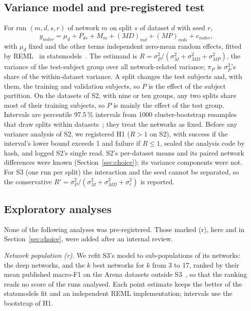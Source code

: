 \documentclass{IEEE_lsens}
\begin{document}
\subsection{Variance model and pre-registered test}
For run $(m,d,s,r)$ of network $m$ on split $s$ of dataset $d$ with seed $r$,
\begin{equation}
y_{mdsr} = \mu_d + P_{ds} + M_m + (MD)_{md} + (MP)_{mds} + e_{mdsr},\label{eq:model}
\end{equation}
with $\mu_d$ fixed and the other terms independent zero-mean random effects, fitted by REML~\cite{patterson1971recovery}
in statsmodels~\cite{seabold2010statsmodels}. The estimand is $R=\sigma^2_P/(\sigma^2_M+\sigma^2_{MD}+\sigma^2_{MP})$,
the variance of the test-subject group over all network-related variance; $\pi_P$ is $\sigma^2_P$'s share of the
within-dataset variance. A split changes the test subjects and, with them, the training and validation subjects, so
$P$ is the effect of the subject partition. On the datasets of S2, with nine or ten groups, any two splits share most
of their training subjects, so $P$ is mainly the effect of the test group. Intervals are percentile 97.5\,\% intervals from 1000 cluster-bootstrap
resamples that draw splits within datasets~\cite{field2007bootstrapping}; they treat the networks as fixed. Before any
variance analysis of S2, we registered H1 ($R>1$ on S2), with success if the interval's lower bound exceeds 1 and
failure if $R\le 1$, sealed the analysis code by hash, and logged S2's single read. S2's per-dataset means and its
paired network differences were known (Section~\ref{sec:choice}); its variance components were not. For S3 (one run per
split) the interaction and the seed cannot be separated, so the conservative
$R'=\sigma^2_P/(\sigma^2_M+\sigma^2_{MD}+\sigma^2_e)$ is reported.

\subsection{Exploratory analyses}
None of the following analyses was pre-registered. Those marked (r), here and in Section~\ref{sec:choice}, were
added after an internal review.

\emph{Network population (r).} We refit S3's model to sub-populations of its networks: the  deep networks, and the
$k$ best networks for $k$ from 3 to 17, ranked by their mean published macro-F1 on the  Arena
datasets outside S3~\cite{burzer2026arena}, so that the ranking reads no score of the runs analysed. Each point
estimate keeps the better of the statsmodels fit and an independent REML implementation; intervals use the bootstrap
of H1.
\end{document}
